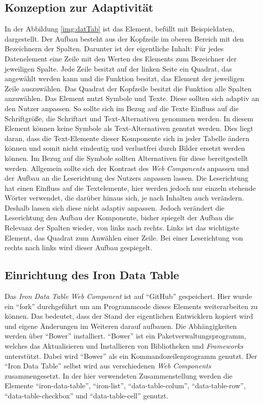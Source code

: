 \documentclass[12pt, paper=a4, bibtotoc, toc=listof, headsepline=true]{scrreprt}
\begin{document}
	\subsection{Konzeption zur Adaptivität}
	\label{sec:konZurAda}
	In der Abbildung \ref{img:datTab} ist das Element, befüllt mit Beispieldaten, dargestellt. Der Aufbau besteht aus der Kopfzeile im oberen Bereich mit den Bezeichnern der Spalten. Darunter ist der eigentliche Inhalt: Für jedes Datenelement eine Zeile mit den Werten des Elements zum Bezeichner der jeweiligen Spalte. Jede Zeile besitzt auf der linken Seite ein Quadrat, das angewählt werden kann und die Funktion besitzt, das Element der jeweiligen Zeile auszuwählen. Das Quadrat der Kopfzeile besitzt die Funktion alle Spalten anzuwählen.
	\newline
	Das Element nutzt Symbole und Texte. Diese sollten sich adaptiv an den Nutzer anpassen. So sollte sich im Bezug auf die Texte Einfluss auf die Schriftgröße, die Schriftart und Text-Alternativen genommen werden. In diesem Element können keine Symbole als Text-Alternativen genutzt werden. Dies liegt daran, dass die Text-Elemente dieser Komponente sich in jeder Tabelle ändern können und somit nicht eindeutig und verlustfrei durch Bilder ersetzt werden können. Im Bezug auf die Symbole sollten Alternativen für diese bereitgestellt werden. Allgemein sollte sich der Kontrast des \emph{Web Components} anpassen und der Aufbau an die Leserichtung des Nutzers anpassen lassen. Die Leserichtung hat einen Einfluss auf die Textelemente, hier werden jedoch nur einzeln stehende Wörter verwendet, die darüber hinaus sich, je nach Inhalten auch verändern. Deshalb lassen sich diese nicht adaptiv anpassen. Jedoch verändert die Leserichtung den Aufbau der Komponente, bisher spiegelt der Aufbau die Relevanz der Spalten wieder, von links nach rechts. Links ist das wichtigste Element, das Quadrat zum Anwählen einer Zeile. Bei einer Leserichtung von rechts nach links wird dieser Aufbau gespiegelt.  
	\subsection{Einrichtung des Iron Data Table}
	Das \emph{Iron Data Table Web Component} ist auf \enquote{GitHub} gespeichert. Hier wurde ein \enquote{fork} durchgeführt um am Programmcode dieses Elements weiterarbeiten zu können. Das bedeutet, dass der Stand der eigentlichen Entwicklern kopiert wird und eigene Änderungen im Weiteren darauf aufbauen. Die Abhängigkeiten werden über \enquote{Bower} installiert. \enquote{Bower} ist ein Paketverwaltungsprogramm, welches das Aktualisieren und Installieren von Bibliotheken und \emph{Frameworks} unterstützt. Dabei wird \enquote{Bower} als ein Kommandozeilenprogramm genutzt\cite{bower}. Der \enquote{Iron Data Table} selbst wird aus verschiedenen \emph{Web Components} zusammengesetzt. In der hier verwendeten Zusammenstellung werden die Elemente \enquote{iron-data-table}, \enquote{iron-list}, \enquote{data-table-colum}, \enquote{data-table-row}, \enquote{data-table-checkbox} und \enquote{data-table-cell}  genutzt.  
\end{document}
